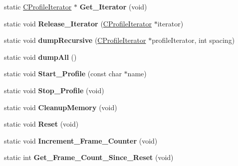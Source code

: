 \begin{DoxyCompactItemize}
\mbox{\label{classCProfileManager_adb73d94f650fc4930daa8b4cb5b474a9}} 
static \hyperlink{classCProfileIterator}{C\+Profile\+Iterator} $\ast$ {\bfseries Get\+\_\+\+Iterator} (void)
\item 
\mbox{\label{classCProfileManager_a3edb7249c6f2bdb8a204692c81643d85}} 
static void {\bfseries Release\+\_\+\+Iterator} (\hyperlink{classCProfileIterator}{C\+Profile\+Iterator} $\ast$iterator)
\item 
\mbox{\label{classCProfileManager_a9c8f2f632c668890d4dc38ef2f4ec9e2}} 
static void {\bfseries dump\+Recursive} (\hyperlink{classCProfileIterator}{C\+Profile\+Iterator} $\ast$profile\+Iterator, int spacing)
\item 
\mbox{\label{classCProfileManager_a24e1f0e68d3f0514d84488867acf8081}} 
static void {\bfseries dump\+All} ()
\item 
\mbox{\label{classCProfileManager_a7bf36c9ca635dcf3ce136d864d054746}} 
static void {\bfseries Start\+\_\+\+Profile} (const char $\ast$name)
\item 
\mbox{\label{classCProfileManager_a8d66bcc5688dc6fe55849258d08e59c1}} 
static void {\bfseries Stop\+\_\+\+Profile} (void)
\item 
\mbox{\label{classCProfileManager_aad68cf5af2848a466e564ab0fe84babb}} 
static void {\bfseries Cleanup\+Memory} (void)
\item 
\mbox{\label{classCProfileManager_a6cb85750c793fa3933b1dee327aff4ac}} 
static void {\bfseries Reset} (void)
\item 
\mbox{\label{classCProfileManager_ab9aa67a7095b6ab9e8d1e7e82a080738}} 
static void {\bfseries Increment\+\_\+\+Frame\+\_\+\+Counter} (void)
\item 
\mbox{\label{classCProfileManager_a8d22ef534dccd484ed01838155dd6b1b}} 
static int {\bfseries Get\+\_\+\+Frame\+\_\+\+Count\+\_\+\+Since\+\_\+\+Reset} (void)
\item 

\end{DoxyCompactItemize}
